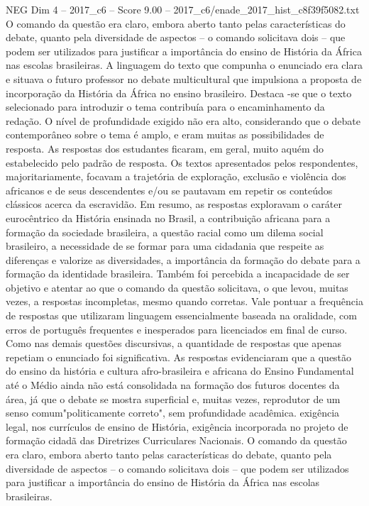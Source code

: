 \begin{textsample}{NEG Dim 4 – 2017\_c6 – Score 9.00 – 2017\_c6/enade\_2017\_hist\_c8f39f5082.txt}
O comando da questão era claro, embora aberto tanto pelas características do debate, quanto pela diversidade de aspectos – o comando solicitava dois – que podem ser utilizados para justificar a importância do ensino de História da África nas escolas brasileiras.
A linguagem do texto que compunha o enunciado era clara e situava o futuro professor no debate multicultural que impulsiona a proposta de incorporação da História da África no ensino brasileiro.
Destaca -se que o texto selecionado para introduzir o tema contribuía para o encaminhamento da redação.
O nível de profundidade exigido não era alto, considerando que o debate contemporâneo sobre o tema é amplo, e eram muitas as possibilidades de resposta.
As respostas dos estudantes ficaram, em geral, muito aquém do estabelecido pelo padrão de resposta.
Os textos apresentados pelos respondentes, majoritariamente, focavam a trajetória de exploração, exclusão e violência dos africanos e de seus descendentes e/ou se pautavam em repetir os conteúdos clássicos acerca da escravidão.
Em resumo, as respostas exploravam o caráter eurocêntrico da História ensinada no Brasil, a contribuição africana para a formação da sociedade brasileira, a questão racial como um dilema social brasileiro, a necessidade de se formar para uma cidadania que respeite as diferenças e valorize as diversidades, a importância da formação do debate para a formação da identidade brasileira.
Também foi percebida a incapacidade de ser objetivo e atentar ao que o comando da questão solicitava, o que levou, muitas vezes, a respostas incompletas, mesmo quando corretas.
Vale pontuar a frequência de respostas que utilizaram linguagem essencialmente baseada na oralidade, com erros de português frequentes e inesperados para licenciados em final de curso.
Como nas demais questões discursivas, a quantidade de respostas que apenas repetiam o enunciado foi significativa.
As respostas evidenciaram que a questão do ensino da história e cultura afro-brasileira e africana do Ensino Fundamental até o Médio ainda não está consolidada na formação dos futuros docentes da área, já que o debate se mostra superficial e, muitas vezes, reprodutor de um senso comum"politicamente correto", sem profundidade acadêmica. exigência legal, nos currículos de ensino de História, exigência incorporada no projeto de formação cidadã das Diretrizes Curriculares Nacionais.
O comando da questão era claro, embora aberto tanto pelas características do debate, quanto pela diversidade de aspectos – o comando solicitava dois – que podem ser utilizados para justificar a importância do ensino de História da África nas escolas brasileiras.

\end{textsample}
